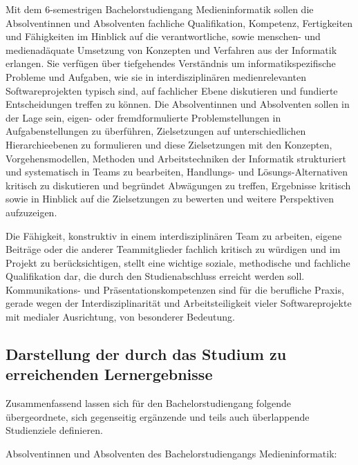 Mit dem 6-semestrigen Bachelorstudiengang Medieninformatik sollen die
Absolventinnen und Absolventen fachliche Qualifikation, Kompetenz,
Fertigkeiten und Fähigkeiten im Hinblick auf die verantwortliche, sowie
menschen- und medienadäquate Umsetzung von Konzepten und Verfahren aus
der Informatik erlangen. Sie verfügen über tiefgehendes Verständnis um
informatikspezifische Probleme und Aufgaben, wie sie in
interdisziplinären medienrelevanten Softwareprojekten typisch sind, auf
fachlicher Ebene diskutieren und fundierte Entscheidungen treffen zu
können. Die Absolventinnen und Absolventen sollen in der Lage sein,
eigen- oder fremdformulierte Problemstellungen in Aufgabenstellungen zu
überführen, Zielsetzungen auf unterschiedlichen Hierarchieebenen zu
formulieren und diese Zielsetzungen mit den Konzepten,
Vorgehensmodellen, Methoden und Arbeitstechniken der Informatik
strukturiert und systematisch in Teams zu bearbeiten, Handlungs- und
Lösungs-Alternativen kritisch zu diskutieren und begründet Abwägungen zu
treffen, Ergebnisse kritisch sowie in Hinblick auf die Zielsetzungen zu
bewerten und weitere Perspektiven aufzuzeigen.

Die Fähigkeit, konstruktiv in einem interdisziplinären Team zu arbeiten,
eigene Beiträge oder die anderer Teammitglieder fachlich kritisch zu
würdigen und im Projekt zu berücksichtigen, stellt eine wichtige
soziale, methodische und fachliche Qualifikation dar, die durch den
Studienabschluss erreicht werden soll. Kommunikations- und
Präsentationskompetenzen sind für die berufliche Praxis, gerade wegen
der Interdisziplinarität und Arbeitsteiligkeit vieler Softwareprojekte
mit medialer Ausrichtung, von besonderer Bedeutung.

\subsection{Darstellung der durch das Studium zu erreichenden
Lernergebnisse}\label{darstellung-der-durch-das-studium-zu-erreichenden-lernergebnisse}

Zusammenfassend lassen sich für den Bachelorstudiengang folgende
übergeordnete, sich gegenseitig ergänzende und teils auch überlappende
Studienziele definieren.

Absolventinnen und Absolventen des Bachelorstudiengangs
Medieninformatik:

